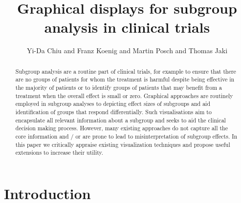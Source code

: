 \documentclass[Afour,sagev,times, doublespace]{sagej}
\begin{document}

\title{Graphical displays for subgroup analysis in clinical trials}

\author{Yi-Da Chiu and Franz Koenig and Martin Posch and Thomas Jaki}




\begin{abstract}
Subgroup analysis are a routine part of clinical trials, for example to ensure that there are no groups of patients for whom the treatment is harmful despite being effective in the majority of patients or to identify groups of patients that may benefit from a treatment when the overall effect is small or zero. Graphical approaches are routinely employed in subgroup analyses to depicting effect sizes of subgroups and aid identification of groups that respond differentially. Such visualisations aim to encapsulate all relevant information about a subgroup and seeks to aid the clinical decision making process. However, many existing approaches do not capture all the core information and / or are prone to lead to misinterpretation of subgroup effects. In this paper we critically appraise existing visualization techniques and propose useful extensions to increase their utility. 
\end{abstract}


\maketitle

\section{Introduction}
\end{document}
